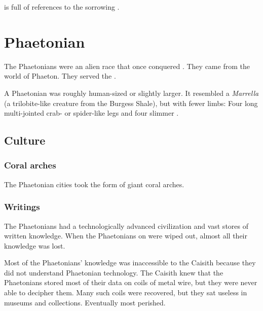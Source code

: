 \WanderersInDarknessEmph is full of references to the sorrowing \nymphs. 
















\section{Phaetonian}
%
The Phaetonians were an alien race that once conquered \Miith.
They came from the world of Phaeton. 
They served the . 

A Phaetonian was roughly human-sized or slightly larger. 
It resembled a \emph{Marrella} (a trilobite-like creature from the Burgess Shale), but with fewer limbs: 
Four long multi-jointed crab- or spider-like legs and four slimmer . 









\subsection{Culture}





\subsubsection{Coral arches}
The Phaetonian cities took the form of giant coral arches. 





\subsubsection{Writings}
The Phaetonians had a technologically advanced civilization and vast stores of written knowledge.
When the Phaetonians on \Miith were wiped out, almost all their knowledge was lost. 

Most of the Phaetonians' knowledge was inaccessible to the Caisith because they did not understand Phaetonian technology. The Caisith knew that the Phaetonians stored most of their data on coils of metal wire, but they were never able to decipher them. Many such coils were recovered, but they sat useless in museums and collections. Eventually most perished. 

